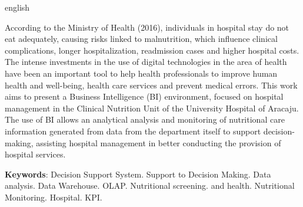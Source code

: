 \setlength{\absparsep}{18pt} %
\begin{resumo}[Abstract]
 \begin{otherlanguage*}{english}
   
   According to the Ministry of Health (2016), individuals in hospital stay do not eat adequately, causing risks linked to malnutrition, which influence clinical complications, longer hospitalization, readmission cases and higher hospital costs. The intense investments in the use of digital technologies in the area of health have been an important tool to help health professionals to improve human health and well-being, health care services and prevent medical errors. This work aims to present a Business Intelligence (BI) environment, focused on hospital management in the Clinical Nutrition Unit of the University Hospital of Aracaju. The use of BI allows an analytical analysis and monitoring of nutritional care information generated from data from the department itself to support decision-making, assisting hospital management in better conducting the provision of hospital services.

   \vspace{\onelineskip}
 
   \noindent 
   \textbf{Keywords}: Decision Support System. Support to Decision Making. Data analysis. Data Warehouse. OLAP. Nutritional screening. and health. Nutritional Monitoring. Hospital. KPI.
 \end{otherlanguage*}
\end{resumo}